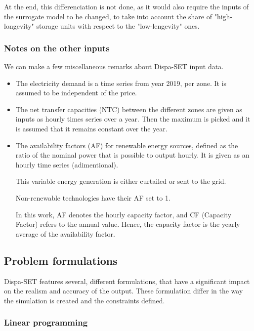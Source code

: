At the end, this differenciation is not done, as it would also require the inputs of the surrogate model to be changed, to take into account the share of "high-longevity" storage units with respect to the "low-lengevity" ones.

\subsubsection{Notes on the other inputs}

We can make a few miscellaneous remarks about Dispa-SET input data.

\begin{itemize}
    \item The electricity demand is a time series from year 2019, per zone. It is assumed to be independent of the price.
    \item The net transfer capacities (NTC) between the different zones are given as inputs as hourly times series over a year. Then the maximum is picked and it is assumed that it remains constant over the year.
    \item The availability factors (AF) for renewable energy sources, defined as the ratio of the nominal power that is possible to output hourly. It is given as an hourly time series (adimentional).
    
    This variable energy generation is either curtailed or sent to the grid.

    Non-renewable technologies have their AF set to 1.

    In this work, AF denotes the hourly capacity factor, and CF (Capacity Factor) refers to the annual value. Hence, the capacity factor is the yearly average of the availability factor. 
\end{itemize}

\subsection{Problem formulations}

Dispa-SET features several, different formulations, that have a significant impact on the realism and accuracy of the output. These formulation differ in the way the simulation is created and the constraints defined.

\subsubsection{Linear programming}

